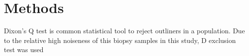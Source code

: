 \chapter{Methods}

Dixon's Q test is common statistical tool to reject outliners in a population. Due to the relative high noiseness of this biopsy samples in this study, D  exclusion test was used 